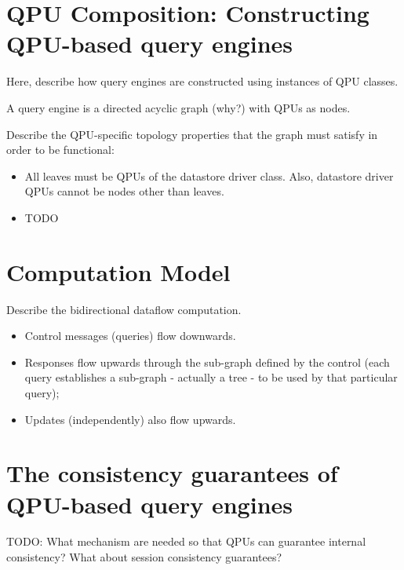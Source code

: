 \section{QPU Composition: Constructing QPU-based query engines}
Here, describe how query engines are constructed using instances of QPU classes.

A query engine is a directed acyclic graph (why?) with QPUs as nodes.

Describe the QPU-specific topology properties that the graph must satisfy in
order to be functional:
\begin{itemize}
  \item All leaves must be QPUs of the datastore driver class.
  Also, datastore driver QPUs cannot be nodes other than leaves.
  \item TODO
\end{itemize}

\section{Computation Model}
Describe the bidirectional dataflow computation.
\begin{itemize}
  \item Control messages (queries) flow downwards.
  \item Responses flow upwards through the sub-graph defined by the control
  (each query establishes a sub-graph - actually a tree - to be used by that
  particular query);
  \item Updates (independently) also flow upwards.
\end{itemize}


\section{The consistency guarantees of QPU-based query engines}
TODO: What mechanism are needed so that QPUs can guarantee internal consistency?
What about session consistency guarantees?